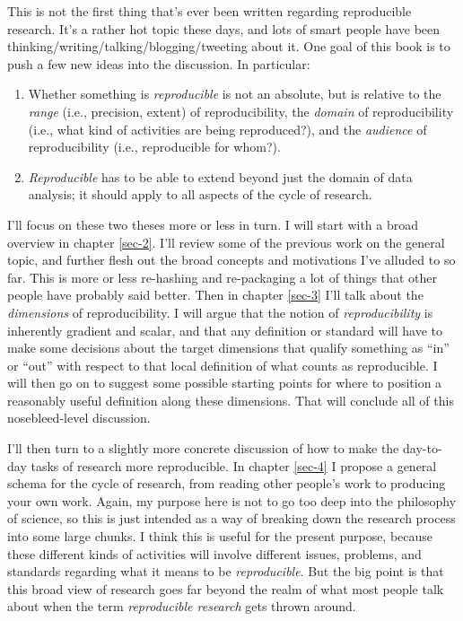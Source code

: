 \documentclass{book}
\begin{document}
This is not the first thing that's ever been written regarding reproducible research. It's a rather hot topic these days, and lots of smart people have been thinking/writing/talking/blogging/tweeting about it. One goal of this book is to push a few new ideas into the discussion. In particular:

\begin{enumerate}
\item Whether something is \emph{reproducible} is not an absolute, but is relative to the \emph{range} (i.e., precision, extent) of reproducibility, the \emph{domain} of reproducibility (i.e., what kind of activities are being reproduced?), and the \emph{audience} of reproducibility (i.e., reproducible for whom?).
\item \emph{Reproducible} has to be able to extend beyond just the domain of data analysis; it should apply to all aspects of the cycle of research.
\end{enumerate}

I'll focus on these two theses more or less in turn.  I will start with a broad overview in chapter \ref{sec-2}. I'll review some of the previous work on the general topic, and further flesh out the broad concepts and motivations I've alluded to so far. This is more or less re-hashing and re-packaging a lot of things that other people have probably said better. Then in chapter \ref{sec-3} I'll talk about the \emph{dimensions} of reproducibility. I will argue that the notion of \emph{reproducibility} is inherently gradient and scalar, and that any definition or standard will have to make some decisions about the target dimensions that qualify something as ``in'' or ``out'' with respect to that local definition of what counts as reproducible. I will then go on to suggest some possible starting points for where to position a reasonably useful definition along these dimensions. That will conclude all of this nosebleed-level discussion.

I'll then turn to a slightly more concrete discussion of how to make the day-to-day tasks of research more reproducible. In chapter \ref{sec-4} I propose a general schema for the cycle of research, from reading other people's work to producing your own work.  Again, my purpose here is not to go too deep into the philosophy of science, so this is just intended as a way of breaking down the research process into some large chunks. I think this is useful for the present purpose, because these different kinds of activities will involve different issues, problems, and standards regarding what it means to be \emph{reproducible}. But the big point is that this broad view of research goes far beyond the realm of what most people talk about when the term \emph{reproducible research} gets thrown around. 
\end{document}
